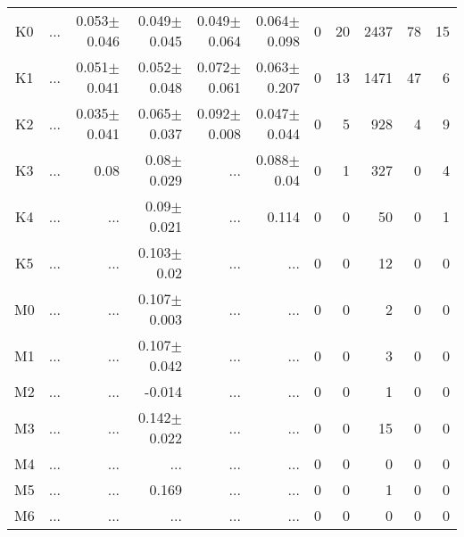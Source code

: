 \begin{table}[t]
\begin{center}
\begin{tabular}{c|rrrrr|rrrrr}
K0	&	 ...	&	0.053$\pm$0.046	&	0.049$\pm$0.045	&	0.049$\pm$0.064	&	0.064$\pm$0.098	&	0	&	20	&	2437	&	78	&	15	\\
K1	&	 ...	&	0.051$\pm$0.041	&	0.052$\pm$0.048	&	0.072$\pm$0.061	&	0.063$\pm$0.207	&	0	&	13	&	1471	&	47	&	6	\\
K2	&	 ...	&	0.035$\pm$0.041	&	0.065$\pm$0.037	&	0.092$\pm$0.008	&	0.047$\pm$0.044	&	0	&	5	&	928	&	4	&	9	\\
K3	&	 ...	&	0.08	&	0.08$\pm$0.029	&	 ...	&	0.088$\pm$0.04	&	0	&	1	&	327	&	0	&	4	\\
K4	&	 ...	&	 ...	&	0.09$\pm$0.021	&	 ...	&	0.114	&	0	&	0	&	50	&	0	&	1	\\
K5	&	 ...	&	 ...	&	0.103$\pm$0.02	&	 ...	&	 ...	&	0	&	0	&	12	&	0	&	0	\\
M0	&	 ...	&	 ...	&	0.107$\pm$0.003	&	 ...	&	 ...	&	0	&	0	&	2	&	0	&	0	\\
M1	&	 ...	&	 ...	&	0.107$\pm$0.042	&	 ...	&	 ...	&	0	&	0	&	3	&	0	&	0	\\
M2	&	 ...	&	 ...	&	-0.014	&	 ...	&	 ...	&	0	&	0	&	1	&	0	&	0	\\
M3	&	 ...	&	 ...	&	0.142$\pm$0.022	&	 ...	&	 ...	&	0	&	0	&	15	&	0	&	0	\\
M4	&	 ...	&	 ...	&	 ...	&	 ...	&	 ...	&	0	&	0	&	0	&	0	&	0	\\
M5	&	 ...	&	 ...	&	0.169	&	 ...	&	 ...	&	0	&	0	&	1	&	0	&	0	\\
M6	&	 ...	&	 ...	&	 ...	&	 ...	&	 ...	&	0	&	0	&	0	&	0	&	0	\\
    \bottomrule
    \end{tabular}
\end{center}
\end{table}

